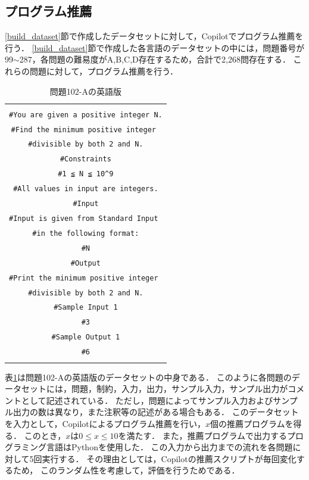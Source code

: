   \subsection{プログラム推薦\label{recommend_program}}
    \ref{build_dataset}節で作成したデータセットに対して，Copilotでプログラム推薦を行う．
    \ref{build_dataset}節で作成した各言語のデータセットの中には，問題番号が99${\sim}$287，各問題の難易度がA,B,C,D存在するため，合計で2,268問存在する．
    これらの問題に対して，プログラム推薦を行う．
    
    \begin{table}[t]
      \caption{問題102-Aの英語版}
      \begin{tabular}{c}
        \begin{tabularx}{23zw}{X}
          \hline
          \verb|#Problem Statement| \\
          \verb|#You are given a positive integer N.| \\
          \verb|#Find the minimum positive integer | \\
          \verb|#divisible by both 2 and N.| \\
          \verb|#Constraints| \\
          \verb|#1 ≦ N ≦ 10^9| \\
          \verb|#All values in input are integers.| \\
          \verb|#Input| \\
          \verb|#Input is given from Standard Input | \\
          \verb|#in the following format:| \\
          \verb|#N| \\
          \verb|#Output| \\
          \verb|#Print the minimum positive integer | \\
          \verb|#divisible by both 2 and N.| \\
          \verb|#Sample Input 1| \\
          \verb|#3| \\
          \verb|#Sample Output 1| \\
          \verb|#6| \\
          \hline
        \end{tabularx}
      \end{tabular}
      \label{problem_102_A_en}
    \end{table}

    表\ref{problem_102_A_en}は問題102-Aの英語版のデータセットの中身である．
    このように各問題のデータセットには，問題，制約，入力，出力，サンプル入力，サンプル出力がコメントとして記述されている．
    ただし，問題によってサンプル入力およびサンプル出力の数は異なり，また注釈等の記述がある場合もある．
    このデータセットを入力として，Copilotによるプログラム推薦を行い，$x$個の推薦プログラムを得る．
    このとき，$x$は$0{\leq}x{\leq}10$を満たす．
    また，推薦プログラムで出力するプログラミング言語はPythonを使用した．
    この入力から出力までの流れを各問題に対して5回実行する．
    その理由としては，Copilotの推薦スクリプトが毎回変化するため，
    このランダム性を考慮して，評価を行うためである．
    
